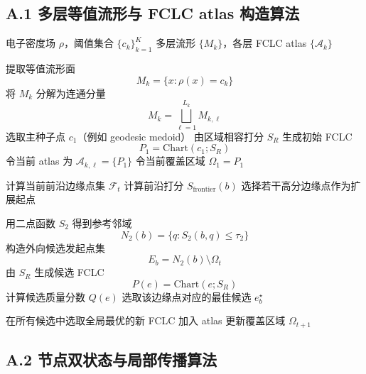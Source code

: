 \documentclass[12pt,a4paper]{ctexart}
\begin{document}
\subsection{A.1 多层等值流形与 FCLC atlas 构造算法}

\begin{algorithm}[H]
\caption{Multi-level Isodensity Manifolds and FCLC Atlas Construction}
\begin{algorithmic}[1]
\Require 电子密度场 \(\rho\)，阈值集合 \(\{c_k\}_{k=1}^{K}\)
\Ensure 多层流形 \(\{M_k\}\)，各层 FCLC atlas \(\{\mathcal A_k\}\)

    \State 提取等值流形面
    \[
    M_k=\{x:\rho(x)=c_k\}
    \]
    \State 将 \(M_k\) 分解为连通分量
    \[
    M_k=\bigsqcup_{\ell=1}^{L_k}M_{k,\ell}
    \]
        \State 选取主种子点 \(c_1\)（例如 geodesic medoid）
        \State 由区域相容打分 \(S_R\) 生成初始 FCLC
        \[
        P_1=\mathrm{Chart}(c_1;S_R)
        \]
        \State 令当前 atlas 为 \(\mathcal A_{k,\ell}=\{P_1\}\)
        \State 令当前覆盖区域 \(\Omega_1=P_1\)

            \State 计算当前前沿边缘点集 \(\mathcal F_t\)
                \State 计算前沿打分 \(S_{\mathrm{frontier}}(b)\)
            \EndFor
            \State 选择若干高分边缘点作为扩展起点

                \State 用二点函数 \(S_2\) 得到参考邻域
                \[
                N_2(b)=\{q:S_2(b,q)\le \tau_2\}
                \]
                \State 构造外向候选发起点集
                \[
                E_b=N_2(b)\setminus\Omega_t
                \]
                    \State 由 \(S_R\) 生成候选 FCLC
                    \[
                    P(e)=\mathrm{Chart}(e;S_R)
                    \]
                    \State 计算候选质量分数 \(Q(e)\)
                \EndFor
                \State 选取该边缘点对应的最佳候选 \(e_b^\star\)
            \EndFor

            \State 在所有候选中选取全局最优的新 FCLC 加入 atlas
            \State 更新覆盖区域 \(\Omega_{t+1}\)
        \EndWhile
    \EndFor
\EndFor
\end{algorithmic}
\end{algorithm}

\subsection{A.2 节点双状态与局部传播算法}
\end{document}
